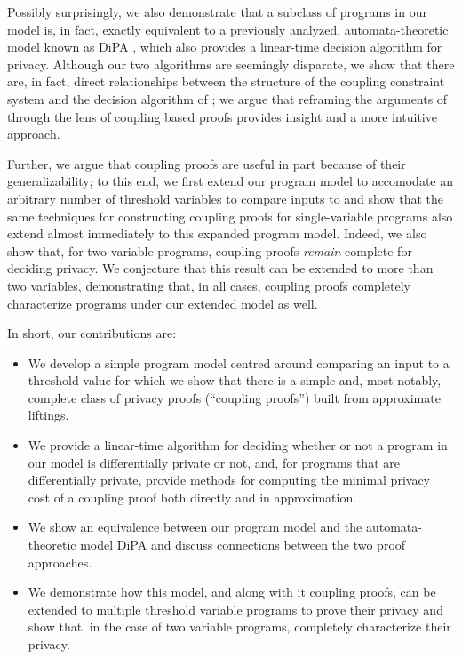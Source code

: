Possibly surprisingly, we also demonstrate that a subclass of programs in our model is, in fact, exactly equivalent to a previously analyzed, automata-theoretic model known as DiPA \cite{chadhaLinearTimeDecidability2021}, which also provides a linear-time decision algorithm for privacy. 
Although our two algorithms are seemingly disparate, we show that there are, in fact, direct relationships between the structure of the coupling constraint system and the decision algorithm of \cite{chadhaLinearTimeDecidability2021}; we argue that reframing the arguments of \cite{chadhaLinearTimeDecidability2021} through the lens of coupling based proofs provides insight and a more intuitive approach. 

Further, we argue that coupling proofs are useful in part because of their generalizability; to this end, we first extend our program model to accomodate an arbitrary number of threshold variables to compare inputs to and show that the same techniques for constructing coupling proofs for single-variable programs also extend almost immediately to this expanded program model. 
Indeed, we also show that, for two variable programs, coupling proofs \textit{remain} complete for deciding privacy. We conjecture that this result can be extended to more than two variables, demonstrating that, in all cases, coupling proofs completely characterize programs under our extended model as well. 


In short, our contributions are:
\begin{itemize}
    \item We develop a simple program model centred around comparing an input to a threshold value for which we show that there is a simple and, most notably, complete class of privacy proofs (``coupling proofs'') built from approximate liftings.
    \item We provide a linear-time algorithm for deciding whether or not a program in our model is differentially private or not, and, for programs that are differentially private, provide methods for computing the minimal privacy cost of a coupling proof both directly and in approximation. 
    \item We show an equivalence between our program model and the automata-theoretic model DiPA \cite{chadhaLinearTimeDecidability2021} and discuss connections between the two proof approaches. 
    \item We demonstrate how this model, and along with it coupling proofs, can be extended to multiple threshold variable programs to prove their privacy and show that, in the case of two variable programs, completely characterize their privacy. 
\end{itemize}